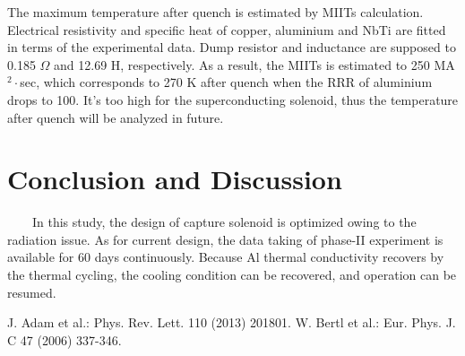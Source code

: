 \documentclass[a4paper, 10pt, twocolumn]{article}
\begin{document}
The maximum temperature after quench is estimated by MIITs calculation.
Electrical resistivity and specific heat of copper, aluminium and NbTi are fitted in terms of the experimental data.
Dump resistor and inductance are supposed to 0.185 $\Omega$ and 12.69 H, respectively.
As a result, the MIITs is estimated to 250 MA$^2\cdot$sec, which corresponds to 270 K after quench when the RRR of aluminium drops to 100.
It's too high for the superconducting solenoid, thus the temperature after quench will be analyzed in future.

\section{Conclusion and Discussion}
~~~~In this study, the design of capture solenoid is optimized owing to the radiation issue.
As for current design, the data taking of phase-II experiment is available for 60 days continuously.
Because Al thermal conductivity recovers by the thermal cycling, the cooling condition can be recovered, and operation can be resumed.

\begin{thebibliography}{10}
	 J. Adam et al.: Phys. Rev. Lett. 110 (2013) 201801.
	 W. Bertl et al.: Eur. Phys. J. C 47 (2006) 337-346.
\end{thebibliography}
\end{document}
